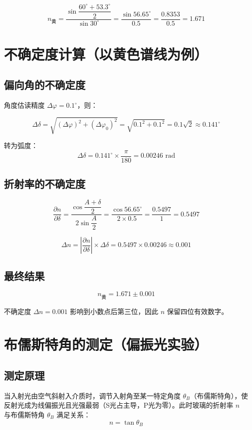 \documentclass[12pt,a4paper]{ctexart}
\begin{document}
\[
n_{\text{黄}} = \frac{\sin\dfrac{60^\circ + 53.3^\circ}{2}}{\sin 30^\circ}
= \frac{\sin 56.65^\circ}{0.5}
= \frac{0.8353}{0.5}
= \boxed{1.671}
\]

\section{不确定度计算（以黄色谱线为例）}

\subsection{偏向角的不确定度}

角度估读精度 $\Delta\varphi = 0.1^\circ$，则：

\[
\Delta\delta = \sqrt{(\Delta\varphi)^2 + (\Delta\varphi_0)^2}
= \sqrt{0.1^2 + 0.1^2}
= 0.1\sqrt{2}
\approx 0.141^\circ
\]

转为弧度：
\[
\Delta\delta = 0.141^\circ \times \frac{\pi}{180} = 0.00246 \text{ rad}
\]

\subsection{折射率的不确定度}

\[
\frac{\partial n}{\partial \delta}
= \frac{\cos\dfrac{A+\delta}{2}}{2\sin\dfrac{A}{2}}
= \frac{\cos 56.65^\circ}{2 \times 0.5}
= \frac{0.5497}{1}
= 0.5497
\]

\[
\Delta n = \left|\frac{\partial n}{\partial \delta}\right| \times \Delta\delta
= 0.5497 \times 0.00246
\approx \boxed{0.001}
\]

\subsection{最终结果}

\[
n_{\text{黄}} = 1.671 \pm 0.001
\]

不确定度 $\Delta n = 0.001$ 影响到小数点后第三位，因此 $n$ 保留四位有效数字。

\section{布儒斯特角的测定（偏振光实验）}

\subsection{测定原理}
当入射光由空气斜射入介质时，调节入射角至某一特定角度 $\theta_B$（布儒斯特角），使反射光成为线偏振光且光强最弱（S光占主导，P光为零）。此时玻璃的折射率 $n$ 与布儒斯特角 $\theta_B$ 满足关系：
\[
n = \tan \theta_B
\]
\end{document}

